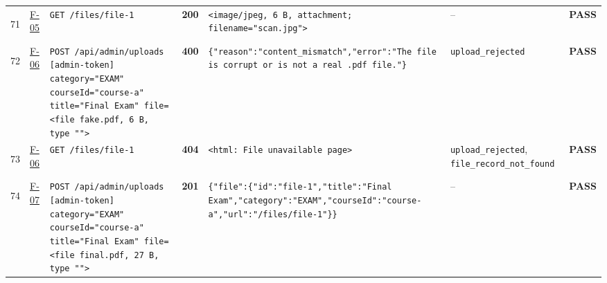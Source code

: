 \documentclass[10pt,a4paper]{article}
\begin{document}
\begin{landscape}
\begin{longtable}{@{}P{0.6cm}P{0.9cm}P{8.5cm}P{1.0cm}P{6.2cm}P{4.2cm}P{1.1cm}@{}}
\hypertarget{call71}{71} & \hyperlink{test-F-05}{F-05} & \texttt{GET /\allowbreak{}files/\allowbreak{}file-\allowbreak{}1} & \textcolor{passgreen}{\textbf{200}} & \texttt{<image/\allowbreak{}jpeg,\allowbreak{} 6 B,\allowbreak{} attachment; filename=\allowbreak{}"\allowbreak{}scan.\allowbreak{}jpg"\allowbreak{}>} & -- & \textcolor{passgreen}{\textbf{PASS}} \\
\hypertarget{call72}{72} & \hyperlink{test-F-06}{F-06} & \texttt{POST /\allowbreak{}api/\allowbreak{}admin/\allowbreak{}uploads [admin-\allowbreak{}token] category=\allowbreak{}"\allowbreak{}EXAM"\allowbreak{} courseId=\allowbreak{}"\allowbreak{}course-\allowbreak{}a"\allowbreak{} title=\allowbreak{}"\allowbreak{}Final Exam"\allowbreak{} file=\allowbreak{}<file fake.\allowbreak{}pdf,\allowbreak{} 6 B,\allowbreak{} type "\allowbreak{}"\allowbreak{}>} & \textcolor{warnamber}{\textbf{400}} & \texttt{\{"\allowbreak{}reason"\allowbreak{}:\allowbreak{}"\allowbreak{}content\_\allowbreak{}mismatch"\allowbreak{},\allowbreak{}"\allowbreak{}error"\allowbreak{}:\allowbreak{}"\allowbreak{}The file is corrupt or is not a real .\allowbreak{}pdf file.\allowbreak{}"\allowbreak{}\}} & \texttt{upload\_\allowbreak{}rejected} & \textcolor{passgreen}{\textbf{PASS}} \\
\hypertarget{call73}{73} & \hyperlink{test-F-06}{F-06} & \texttt{GET /\allowbreak{}files/\allowbreak{}file-\allowbreak{}1} & \textcolor{warnamber}{\textbf{404}} & \texttt{<html:\allowbreak{} File unavailable page>} & \texttt{upload\_\allowbreak{}rejected}, \texttt{file\_\allowbreak{}record\_\allowbreak{}not\_\allowbreak{}found} & \textcolor{passgreen}{\textbf{PASS}} \\
\hypertarget{call74}{74} & \hyperlink{test-F-07}{F-07} & \texttt{POST /\allowbreak{}api/\allowbreak{}admin/\allowbreak{}uploads [admin-\allowbreak{}token] category=\allowbreak{}"\allowbreak{}EXAM"\allowbreak{} courseId=\allowbreak{}"\allowbreak{}course-\allowbreak{}a"\allowbreak{} title=\allowbreak{}"\allowbreak{}Final Exam"\allowbreak{} file=\allowbreak{}<file final.\allowbreak{}pdf,\allowbreak{} 27 B,\allowbreak{} type "\allowbreak{}"\allowbreak{}>} & \textcolor{passgreen}{\textbf{201}} & \texttt{\{"\allowbreak{}file"\allowbreak{}:\allowbreak{}\{"\allowbreak{}id"\allowbreak{}:\allowbreak{}"\allowbreak{}file-\allowbreak{}1"\allowbreak{},\allowbreak{}"\allowbreak{}title"\allowbreak{}:\allowbreak{}"\allowbreak{}Final Exam"\allowbreak{},\allowbreak{}"\allowbreak{}category"\allowbreak{}:\allowbreak{}"\allowbreak{}EXAM"\allowbreak{},\allowbreak{}"\allowbreak{}courseId"\allowbreak{}:\allowbreak{}"\allowbreak{}course-\allowbreak{}a"\allowbreak{},\allowbreak{}"\allowbreak{}url"\allowbreak{}:\allowbreak{}"\allowbreak{}/\allowbreak{}files/\allowbreak{}file-\allowbreak{}1"\allowbreak{}\}\}} & -- & \textcolor{passgreen}{\textbf{PASS}} \\

\end{longtable}
\end{landscape}
\end{document}
